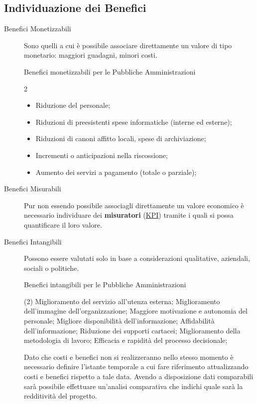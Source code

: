 \subsection{Individuazione dei Benefici}\label{sub:ftt_individuazione_dei_benefici} %
\begin{description}
    \item[Benefici Monetizzabili] Sono quelli a cui è possibile associare direttamente un valore di tipo monetario: maggiori guadagni, minori costi.
        \begin{example}{Benefici monetizzabili per le Pubbliche Amministrazioni}{}
            \begin{multicols}{2}
                \begin{itemize}
                    \item Riduzione del personale;
                    \item Riduzioni di preesistenti spese informatiche (interne ed esterne);
                    \item Riduzioni di canoni affitto locali, spese di archiviazione;
                    \item Incrementi o anticipazioni nella riscossione;
                    \item Aumento dei servizi a pagamento (totale o parziale);
                \end{itemize}
            \end{multicols}
        \end{example}
    \item[Benefici Misurabili] Pur non essendo possibile associagli direttamente un valore economico è necessario individuare dei \textbf{misuratori} (\hyperref[def:kpi]{KPI}) tramite i quali si possa quantificare il loro valore.
    \item[Benefici Intangibili] Possono essere valutati solo in base a considerazioni qualitative, aziendali, sociali o politiche.
        \begin{example}{Benefici intangibili per le Pubbliche Amministrazioni}{}
            \begin{tasks}(2)    
                \task Miglioramento del servizio all'utenza esterna;
                \task Miglioramento dell'immagine dell'organizzazione;
                \task Maggiore motivazione e autonomia del personale;
                \task Migliore disponibilità dell'informazione;
                \task Affidabilità dell'informazione;
                \task Riduzione dei supporti cartacei;
                \task Miglioramento della metodologia di lavoro;
                \task Efficacia e rapidità del processo decisionale;
            \end{tasks}
        \end{example}
        Dato che costi e benefici non si realizzeranno nello stesso momento è necessario definire l'istante temporale a cui fare riferimento attualizzando costi e benefici rispetto a tale data.
        Avendo a disposizione dati comparabili sarà possibile effettuare un'analisi comparativa che indichi quale sarà la redditività del progetto.
\end{description}
